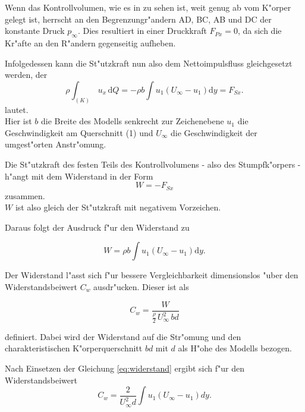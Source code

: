 Wenn das Kontrollvolumen, wie es in  zu sehen ist, weit genug ab vom K"orper gelegt ist, herrscht an den Begrenzungr"andern AD, BC, AB und DC der konstante Druck $p_{\infty}$.
Dies resultiert in einer Druckkraft $F_{Px} = 0$, da sich die Kr"afte an den R"andern gegenseitig aufheben.

Infolgedessen kann die St"utzkraft nun also dem Nettoimpulsfluss gleichgesetzt werden, der
\begin{equation}
	\label{eq:nettoimpulsfluss}
	\rho \int_{(K)} \, u_x \, \mathrm{d}Q	= -\rho b \int u_1(U_{\infty} - u_1) \mathrm{d}y = F_{Sx}.	
\end{equation}
lautet.\\
Hier ist $b$ die Breite des Modells senkrecht zur Zeichenebene $u_1$ die Geschwindigkeit am Querschnitt (1) und  $U_{\infty}$ die Geschwindigkeit der umgest"orten Anstr"omung.

Die St"utzkraft des festen Teils des Kontrollvolumens - also des Stumpfk"orpers - h"angt mit dem Widerstand in der Form
\begin{equation}
	\label{eq:W=-F_Sx}
	W = - F_{Sx}
\end{equation}
zusammen.\\
$W$ ist also gleich der St"utzkraft mit negativem Vorzeichen.

Daraus folgt der Ausdruck f"ur den Widerstand zu
\begin{center}
	\begin{equation}
		\label{eq:widerstand}
		W = \rho b \int u_{1} (U_{\infty}- u_{1}) \mathrm{d}y.
	\end{equation}
\end{center}

Der Widerstand l"asst sich f"ur bessere Vergleichbarkeit dimensionslos "uber den Widerstandsbeiwert $C_w$ ausdr"ucken. Dieser ist als 
\begin{center}
	\begin{equation}
		\label{eq:def-c_w}
		C_w = \frac{W}{\frac{\rho}{2}\, U_{\infty}^2 \, bd}
	\end{equation}
\end{center}
definiert. Dabei wird der Widerstand auf die Str"omung und den charakteristischen K"orperquerschnitt $bd$ mit $d$ als H"ohe des Modells bezogen.

Nach Einsetzen der Gleichung \ref{eq:widerstand} ergibt sich f"ur den Widerstandsbeiwert
\begin{equation}
	\label{eq:Bestimmungsgleichung C_w}
	C_w = \frac{2}{U_{\infty}^2 d} \int u_{1}(U_{\infty} - u_{1}) dy.
\end{equation}

